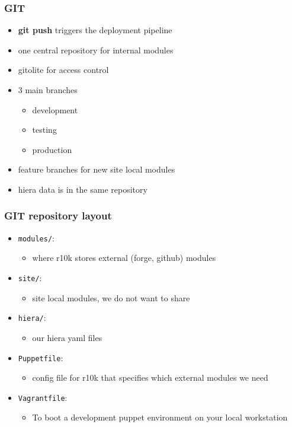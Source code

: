 \documentclass{beamer}
\begin{document}
\begin{frame}
  \frametitle{GIT}

  \begin{itemize}
  \item<1-> \textbf{git push} triggers the deployment pipeline
  \item<2-> one central repository for internal modules
  \item<2-> gitolite for access control
  \item<2-> 3 main branches
    \begin{itemize}
    \item development
    \item testing
    \item production
    \end{itemize}
  \item<2-> feature branches for new site local modules
  \item<2-> hiera data is in the same repository
  \end{itemize}
\end{frame}

\begin{frame}
  \frametitle{GIT repository layout}

  \begin{itemize}
  \item \texttt{modules/}:
    \begin{itemize}
    \item where r10k stores external (forge, github) modules
    \end{itemize}
  \item \texttt{site/}:
    \begin{itemize}
    \item site local modules, we do not want to share
    \end{itemize}
  \item \texttt{hiera/}:
    \begin{itemize}
    \item our hiera yaml files
    \end{itemize}
  \item \texttt{Puppetfile}:
    \begin{itemize}
    \item config file for r10k that specifies which external modules we need
    \end{itemize}
  \item \texttt{Vagrantfile}:
    \begin{itemize}
    \item To boot a development puppet environment on your local workstation
    \end{itemize}
  \end{itemize}
\end{frame}
\end{document}
